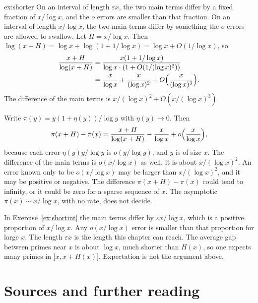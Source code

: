 \begin{solution}{ex:shorter}
\idea On an interval of length $\varepsilon x$, the two main terms differ by a fixed fraction of $x/\log x$, and the $o$ errors are smaller than that fraction. On an interval of length $x/\log x$, the two main terms differ by something the $o$ errors are allowed to swallow.
\writeup Let $H=x/\log x$. Then $\log(x+H)=\log x+\log(1+1/\log x)=\log x+O(1/\log x)$, so
\begin{align*}
\frac{x+H}{\log(x+H)}
&=\frac{x(1+1/\log x)}{\log x\cdot(1+O(1/(\log x)^2))}\\
&=\frac x{\log x}+\frac x{(\log x)^2}+O\Bigl(\frac x{(\log x)^3}\Bigr).
\end{align*}
The difference of the main terms is $x/(\log x)^2+O(x/(\log x)^3)$.

Write $\pi(y)=y(1+\eta(y))/\log y$ with $\eta(y)\to0$. Then
\[
\pi(x+H)-\pi(x)=\frac{x+H}{\log(x+H)}-\frac x{\log x}+o\Bigl(\frac x{\log x}\Bigr),
\]
because each error $\eta(y)y/\log y$ is $o(y/\log y)$, and $y$ is of size $x$. The difference of the main terms is $o(x/\log x)$ as well: it is about $x/(\log x)^2$. An error known only to be $o(x/\log x)$ may be larger than $x/(\log x)^2$, and it may be positive or negative. The difference $\pi(x+H)-\pi(x)$ could tend to infinity, or it could be zero for a sparse sequence of $x$. The asymptotic $\pi(x)\sim x/\log x$, with no rate, does not decide.

In Exercise~\ref{ex:shortint} the main terms differ by $\varepsilon x/\log x$, which is a positive proportion of $x/\log x$. Any $o(x/\log x)$ error is smaller than that proportion for large $x$. The length $\varepsilon x$ is the length this chapter can reach. The average gap between primes near $x$ is about $\log x$, much shorter than $H(x)$, so one expects many primes in $]x,x+H(x)]$. Expectation is not the argument above.
\end{solution}

\section*{Sources and further reading}

